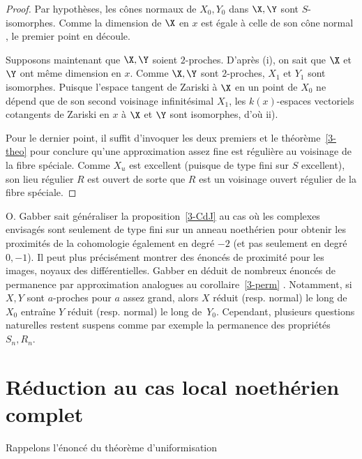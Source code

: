 \documentclass[10pt]{../fichiers-configuration-latex/smfart}
\begin{document}
\begin{proof}

Par hypothèses, les cônes normaux de $X_0,Y_0$ dans $\X,{{\Y}}$
sont $S$-isomorphes. Comme la dimension de $\X$ en $x$ est égale
à celle de son cône normal \cite[15.9]{CRT@Matsumura}, le premier
point en découle.

Supposons maintenant que $\X,{{\Y}}$ soient $2$-proches. D'après
(i), on sait que $\X$ et ${{\Y}}$ ont même dimension en $x$. Comme
$\X,{{\Y}}$ sont $2$-proches, $X_1$ et $Y_1$ sont isomorphes. Puisque
l'espace tangent de Zariski à $\X$ en un point de $X_0$ ne dépend
que de son second voisinage infinitésimal $X_1$,  les $k(x)$-espaces
vectoriels cotangents de Zariski en $x$ à $\X$ et ${{\Y}}$ sont
isomorphes, d'où ii).

Pour le dernier point, il suffit d'invoquer les deux premiers et
le théorème~\ref{3-theo} pour conclure qu'une approximation assez
fine est régulière au voisinage de la fibre spéciale. Comme $X_u$
est excellent (puisque de type fini sur $S$ excellent), son lieu
régulier $R$ est ouvert de sorte que $R$ est un voisinage ouvert
régulier de la fibre spéciale.\end{proof}

 \begin{remarque}\label{3-remgabber} O. Gabber sait généraliser
 la proposition~\ref{3-CdJ} au cas où les complexes envisagés
 sont seulement de type fini sur un anneau noethérien pour
 obtenir  les proximités de la cohomologie également en
 degré $-2$ (et pas seulement en degré $0,-1$). Il peut plus
 précisément montrer des énoncés de proximité pour les images,
 noyaux des différentielles\footnotemark. Gabber en déduit de
 nombreux énoncés de permanence par approximation analogues au
 corollaire~\ref{3-perm} . Notamment, si $X,Y$ sont $a$-proches pour
 $a$ assez grand, alors $X$ réduit (resp. normal) le long de $X_0$ entraîne $Y$
 réduit (resp. normal) le long de $Y_0$. Cependant, plusieurs questions naturelles
 restent suspens comme par exemple la permanence des propriétés
 $S_n,R_n$. \end{remarque}
\section{Réduction au cas local noethérien complet}Rappelons
l'énoncé du théorème d'uniformisation
\end{document}
